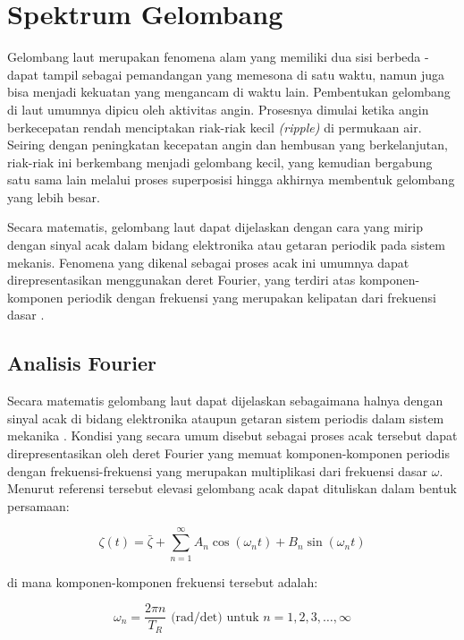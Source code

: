 \section{Spektrum Gelombang}
\label{sec:spektrum-gelombang}

Gelombang laut merupakan fenomena alam yang memiliki dua sisi berbeda - dapat tampil sebagai pemandangan yang memesona di satu waktu, namun juga bisa menjadi kekuatan yang mengancam di waktu lain. Pembentukan gelombang di laut umumnya dipicu oleh aktivitas angin. Prosesnya dimulai ketika angin berkecepatan rendah menciptakan riak-riak kecil \emph{(ripple)} di permukaan air. Seiring dengan peningkatan kecepatan angin dan hembusan yang berkelanjutan, riak-riak ini berkembang menjadi gelombang kecil, yang kemudian bergabung satu sama lain melalui proses superposisi hingga akhirnya membentuk gelombang yang lebih besar.

Secara matematis, gelombang laut dapat dijelaskan dengan cara yang mirip dengan sinyal acak dalam bidang elektronika atau getaran periodik pada sistem mekanis. Fenomena yang dikenal sebagai proses acak ini umumnya dapat direpresentasikan menggunakan deret Fourier, yang terdiri atas komponen-komponen periodik dengan frekuensi yang merupakan kelipatan dari frekuensi dasar \citep{Djatmiko_2012}.

\subsection{Analisis Fourier}
\label{subsec:analisis-fourier}

Secara matematis gelombang laut dapat dijelaskan sebagaimana halnya dengan sinyal acak di bidang elektronika ataupun getaran sistem periodis dalam sistem mekanika \citep{Djatmiko_2012}. Kondisi yang secara umum disebut sebagai proses acak tersebut dapat direpresentasikan oleh deret Fourier yang memuat komponen-komponen periodis dengan frekuensi-frekuensi yang merupakan multiplikasi dari frekuensi dasar $\omega$. Menurut referensi tersebut elevasi gelombang acak dapat dituliskan dalam bentuk persamaan:

\begin{equation}
\zeta(t) = \bar{\zeta} + \sum_{n=1}^{\infty} A_n\cos(\omega_nt) + B_n\sin(\omega_nt)
\label{eq:acak1}
\end{equation}

di mana komponen-komponen frekuensi tersebut adalah:

\begin{equation}
\omega_n = \frac{2\pi n}{T_R} \text{ (rad/det) untuk } n = 1,2,3,\ldots,\infty
\label{eq:acak2}
\end{equation}

